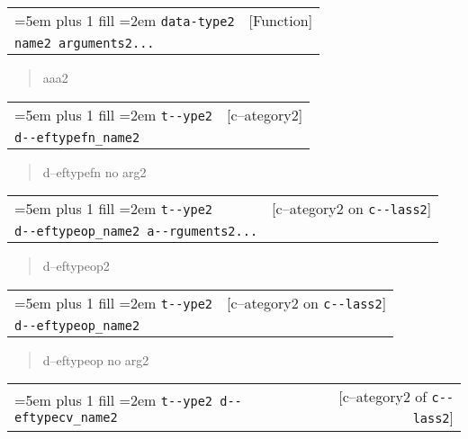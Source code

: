 \documentclass{book}
\begin{document}
\begin{titlepage}
\noindent\begin{tabularx}{\linewidth}{@{}Xr}
\rightskip=5em plus 1 fill
\hangindent=2em
\texttt{data-type2}& [Function]\\
\texttt{name2 arguments2...}\end{tabularx}

%
\begin{quote}
\unskip{\parskip=0pt\noindent}%
aaa2
\end{quote}


\noindent\begin{tabularx}{\linewidth}{@{}Xr}
\rightskip=5em plus 1 fill
\hangindent=2em
\texttt{t{-}{-}ype2}& [c--ategory2]\\
\texttt{d{-}{-}eftypefn\_name2}\end{tabularx}

%
\begin{quote}
\unskip{\parskip=0pt\noindent}%
d--eftypefn no arg2
\end{quote}


\noindent\begin{tabularx}{\linewidth}{@{}Xr}
\rightskip=5em plus 1 fill
\hangindent=2em
\texttt{t{-}{-}ype2}& [c--ategory2 on \texttt{c{-}{-}lass2}]\\
\texttt{d{-}{-}eftypeop\_name2 a{-}{-}rguments2...}\end{tabularx}

%
\begin{quote}
\unskip{\parskip=0pt\noindent}%
d--eftypeop2
\end{quote}


\noindent\begin{tabularx}{\linewidth}{@{}Xr}
\rightskip=5em plus 1 fill
\hangindent=2em
\texttt{t{-}{-}ype2}& [c--ategory2 on \texttt{c{-}{-}lass2}]\\
\texttt{d{-}{-}eftypeop\_name2}\end{tabularx}

%
\begin{quote}
\unskip{\parskip=0pt\noindent}%
d--eftypeop no arg2
\end{quote}


\noindent\begin{tabularx}{\linewidth}{@{}Xr}
\rightskip=5em plus 1 fill
\hangindent=2em
\texttt{t{-}{-}ype2 d{-}{-}eftypecv\_name2}& [c--ategory2 of \texttt{c{-}{-}lass2}]
\end{tabularx}


\end{titlepage}
\end{document}
